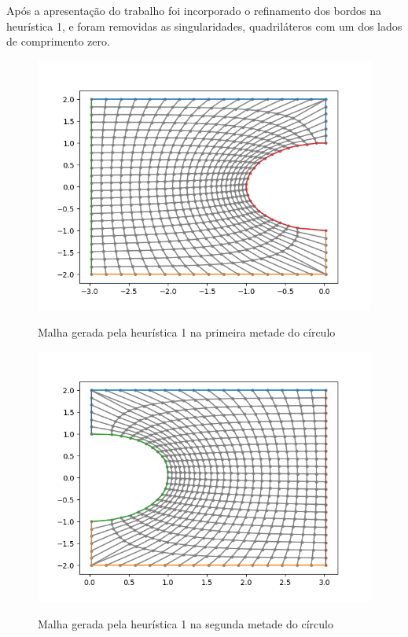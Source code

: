 \documentclass[a4paper]{article}
\begin{document}
Após a apresentação do trabalho foi incorporado o refinamento dos bordos na heurística 1, e foram removidas as singularidades, quadriláteros com um dos lados de comprimento zero.


 \begin{figure}[h]
 	\centering
 	\includegraphics[width=1.0\textwidth]{heuristica_1_50pts_top1.png}
 	\label{fig:heuristic1_top1} 
 	\caption[caption]{Malha gerada pela heurística 1 na primeira metade do círculo}
 \end{figure}


 \begin{figure}[h]
	\centering
	\includegraphics[width=1.0\textwidth]{heuristica_1_50pts_top2.png}
	\label{fig:heuristic1_top2} 
	\caption[caption]{Malha gerada pela heurística 1 na segunda metade do círculo}
\end{figure}
\end{document}
